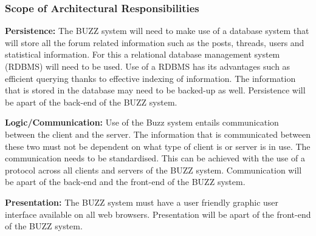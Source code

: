 \documentclass[a4paper,12pt]{article}
\begin{document}
\subsubsection{Scope of Architectural Responsibilities}


\begin{flushleft}
\textbf{Persistence:}
The BUZZ system will need to make use of a database system that will store all the forum related information such as the posts, threads, users and statistical information. For this a relational database management system (RDBMS) will need to be used. Use of a RDBMS has its advantages such as efficient querying thanks to effective indexing of information. The information that is stored in the database may need to be backed-up as well. Persistence will be apart of the back-end of the BUZZ system.
\end{flushleft}

\begin{flushleft}
\textbf{Logic/Communication:}
Use of the Buzz system entails communication between the client and the server. The information that is communicated between these two must not be dependent on what type of client is or server is in use. The communication needs to be standardised. This can be achieved with the use of a protocol across all clients and servers of the BUZZ system. Communication will be apart of the back-end and the front-end of the BUZZ system.
\end{flushleft}

\begin{flushleft}
\textbf{Presentation:}
The BUZZ system must have a user friendly graphic user interface available on all web browsers. Presentation will be apart of the front-end of the BUZZ system.
\end{flushleft}
\end{document}
